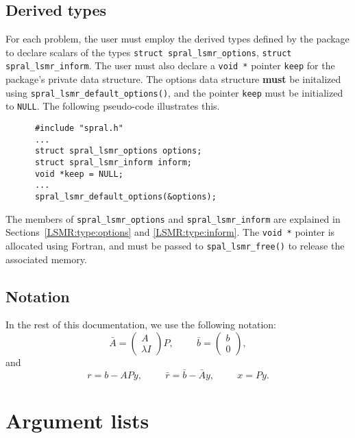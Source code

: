 
\subsection{Derived types}

For each problem, the user must employ the derived types defined by the
package to declare scalars of the types
{\tt struct spral\_lsmr\_options}, {\tt struct spral\_lsmr\_inform}. The user
must also
declare a \texttt{void~*} pointer {\tt keep} for the package's private data
structure. The options data structure \textbf{must} be initalized using
\texttt{spral\_lsmr\_default\_options()}, and the pointer \texttt{keep} must be
initialized to \texttt{NULL}.
The following pseudo-code illustrates this.
\begin{verbatim}
      #include "spral.h"
      ...
      struct spral_lsmr_options options;
      struct spral_lsmr_inform inform;
      void *keep = NULL;
      ...
      spral_lsmr_default_options(&options);
\end{verbatim}
The members of {\tt spral\_lsmr\_options} and {\tt spral\_lsmr\_inform} are
explained in Sections~\ref{LSMR:type:options} and \ref{LSMR:type:inform}.
The \texttt{void~*} pointer is allocated using Fortran, and must be passed to
\texttt{spal\_lsmr\_free()} to release the associated memory.

\subsection{Notation}
In the rest of this documentation, we use the following notation:
$$
   \bar{A} = \left( \begin{array}{c}
         A \\
         \lambda I
      \end{array} \right)P, \hspace{1cm} \bar{b} = \left( \begin{array}{c}
         b \\
         0
      \end{array} \right),
$$
and
$$
   r = b - APy , \hspace{1cm}  \bar{r} = \bar{b} - \bar{A}y,
      \hspace{1cm}  x = Py.
$$

\newpage
\section{Argument lists}

